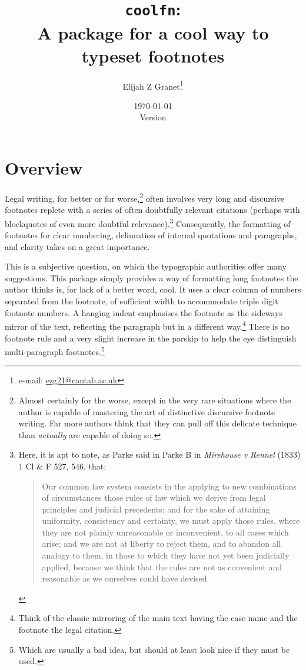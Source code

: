 \documentclass[12pt]{article}
\date{\today\\\smallskip\ttfamily Version \coolfnversionnumber}
\author{Elijah Z Granet\thanks{e-mail: \href{mailto:ezg21@cantab.ac.uk}{\ttfamily ezg21@cantab.ac.uk}}}
\title{\texttt{coolfn}:\\A package for a cool way to typeset footnotes}
\begin{document}
\maketitle
\tableofcontents
\clearpage
\section{Overview}
Legal writing, for better or for worse,\footnote{Almost certainly for the worse, except in the very rare situations where the author is capable of mastering the art of distinctive discursive footnote writing.  Far more authors think that they can pull off this delicate technique than \textit{actually} are capable of doing so. } often involves very long and discursive footnotes replete with a series of often doubtfully relevant citations (perhaps with blockquotes of  even more doubtful relevance).\footnote{Here, it is apt to note, as Parke  said in Parke B in \textit{Mirehouse v Rennel} (1833) 1 Cl \& F 527, 546, that:
\begin{quote}
Our common law system consists in the applying to new combinations of circumstances those rules of law which we derive from legal principles and judicial precedents; and for the sake of attaining uniformity, consistency and certainty, we must apply those rules, where they are not plainly unreasonable or inconvenient, to all cases which arise; and we are not at liberty to reject them, and to abandon all analogy to them, in those to which they have not yet been judicially applied, because we think that the rules are not as convenient and reasonable as we ourselves could have devised.\end{quote}} Consequently, the formatting of footnotes for clear numbering, delineation of internal quotations and paragraphs, and clarity takes on a great importance.

This is a subjective question, on which the typographic authorities offer many suggestions. This package simply provides a way of formatting long footnotes the author thinks is, for lack of a better word, cool. It uses a clear column of numbers separated from the footnote, of sufficient width to accommodate triple digit footnote numbers.  A hanging indent emphasises the footnote as the sideways mirror of the text, reflecting the paragraph but in a different way.\footnote{Think of the classic mirroring of the main text having the case name and the footnote the legal citation.} There is no footnote rule and a very slight increase in the parskip to help the eye distinguish multi-paragraph footnotes.\footnote{Which are usually a bad idea, but should at least look nice if they must be used.}
\end{document}
